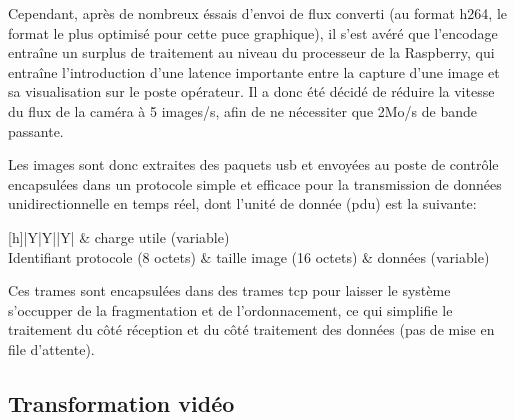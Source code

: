 			Cependant, après de nombreux éssais d'envoi de flux converti (au format h264, le format le plus optimisé pour cette puce graphique), il s'est avéré que l'encodage entraîne un surplus de traitement au niveau du processeur de la Raspberry, qui entraîne l'introduction d'une latence importante entre la capture d'une image et sa visualisation sur le poste opérateur.
			Il a donc été décidé de réduire la vitesse du flux de la caméra à 5 images/s, afin de ne nécessiter que 2Mo/s de bande passante.
			\par
			Les images sont donc extraites des paquets \gls{usb} et envoyées au poste de contrôle encapsulées dans un protocole simple et efficace pour la transmission de données unidirectionnelle en temps réel, dont l'unité de donnée (\gls{pdu}) est la suivante:

			\begin{center}
				\scriptsize
				\begin{tabularx}{\textwidth}[h]{|Y|Y||Y|}
					\toprule
					 & charge utile (variable) \\
					\midrule
					Identifiant protocole (8 octets) & taille image (16 octets) & données (variable)\\
					\bottomrule
				\end{tabularx}
			\end{center}

			Ces trames sont encapsulées dans des trames \gls{tcp} pour laisser le système s'occupper de la fragmentation et de l'ordonnacement, ce qui simplifie le traitement du côté réception et du côté traitement des données (pas de mise en file d'attente).
			
		\subsection{Transformation vidéo}
		\label{sub:transfo}
		
